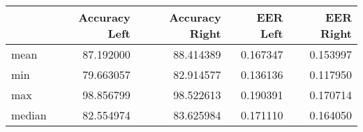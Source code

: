 \begin{tabular}{lrrrr}
\toprule
{} &  Accuracy Left &  Accuracy Right &  EER Left &  EER Right \\
\midrule
mean   &      87.192000 &       88.414389 &  0.167347 &   0.153997 \\
min    &      79.663057 &       82.914577 &  0.136136 &   0.117950 \\
max    &      98.856799 &       98.522613 &  0.190391 &   0.170714 \\
median &      82.554974 &       83.625984 &  0.171110 &   0.164050 \\
\bottomrule
\end{tabular}

